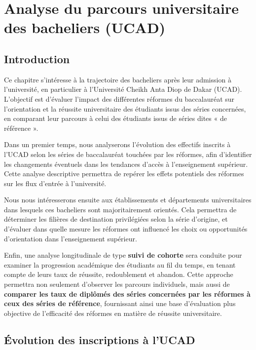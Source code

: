 \chapter{Analyse du parcours universitaire des bacheliers (UCAD)}

\section{Introduction}

Ce chapitre s’intéresse à la trajectoire des bacheliers après leur admission à l’université, en particulier à l’Université Cheikh Anta Diop de Dakar (UCAD). 
L’objectif est d’évaluer l’impact des différentes réformes du baccalauréat sur l’orientation et la réussite universitaire des étudiants issus des séries concernées, en comparant leur parcours à celui des étudiants issus de séries dites « de référence ».

Dans un premier temps, nous analyserons l’évolution des effectifs inscrits à l’UCAD selon les séries de baccalauréat touchées par les réformes, afin d’identifier les changements éventuels dans les tendances d’accès à l’enseignement supérieur. 
Cette analyse descriptive permettra de repérer les effets potentiels des réformes sur les flux d’entrée à l’université.

Nous nous intéresserons ensuite aux établissements et départements universitaires dans lesquels ces bacheliers sont majoritairement orientés. 
Cela permettra de déterminer les filières de destination privilégiées selon la série d’origine, et d’évaluer dans quelle mesure les réformes ont influencé les choix ou opportunités d’orientation dans l’enseignement supérieur.

Enfin, une analyse longitudinale de type \textbf{suivi de cohorte} sera conduite pour examiner la progression académique des étudiants au fil du temps, en tenant compte de leurs taux de réussite, redoublement et abandon. 
Cette approche permettra non seulement d’observer les parcours individuels, mais aussi de \textbf{comparer les taux de diplômés des séries concernées par les réformes à ceux des séries de référence}, fournissant ainsi une base d’évaluation plus objective de l’efficacité des réformes en matière de réussite universitaire.

\newpage
\section{Évolution des inscriptions à l'UCAD}

